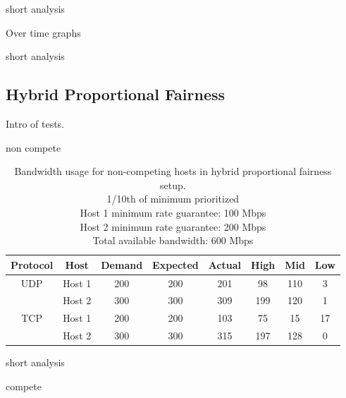 \documentclass[accepted,single]{gipaper}
\begin{document}
short analysis

Over time graphs

short analysis

\subsection{Hybrid Proportional Fairness}
\label{dba_hybr}
Intro of tests.

non compete

\begin{table}[h]
	\label{hybr_nc}
	\vspace{-3mm}
	\begin{center}
		\begin{small}
		\setlength\tabcolsep{1.5pt}
			\begin{tabular}{cccccccc}
				Protocol & Host & Demand & Expected & Actual & High & Mid & Low\\
				\hline
				UDP & Host 1 & 200 & 200 & 201 & 98 & 110 & 3\\
				    & Host 2 & 300 & 300 & 309 & 199 & 120 & 1\\
				\hline
				TCP & Host 1 & 200 & 200 & 103 & 75 & 15 & 17\\
				    & Host 2 & 300 & 300 & 315 & 197 & 128 & 0\\
			\end{tabular}
		\end{small}
	\end{center}
	\caption{Bandwidth usage for non-competing hosts in hybrid proportional fairness setup.\\
	1/10th of minimum prioritized\\	
	Host 1 minimum rate guarantee: 100 Mbps\\
	Host 2 minimum rate guarantee: 200 Mbps\\	
	Total available bandwidth: 600 Mbps}
	\vspace{-3mm}
\end{table}

short analysis

compete
\end{document}
